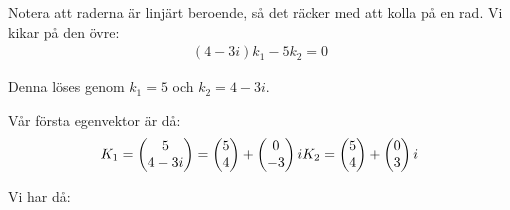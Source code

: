 \noindent Notera att raderna är linjärt beroende, så det räcker med att kolla på en rad. Vi kikar på den övre:
\begin{equation*}
  \begin{gathered}
    (4-3i)k_1-5k_2 = 0
  \end{gathered}
\end{equation*}\par
\noindent Denna löses genom $k_1 = 5$ och $k_2 = 4-3i$.\par
\noindent Vår första egenvektor är då:
\begin{equation*}
  \begin{gathered}
    K_1 = \begin{pmatrix}5\\4-3i\end{pmatrix} = \begin{pmatrix}5\\4\end{pmatrix}+\begin{pmatrix}0\\-3\end{pmatrix}i
  \end{gathered}\\
  K_2 = \begin{pmatrix}5\\4\end{pmatrix}+\begin{pmatrix}0\\3\end{pmatrix}i
\end{equation*}\par
\noindent Vi har då:
